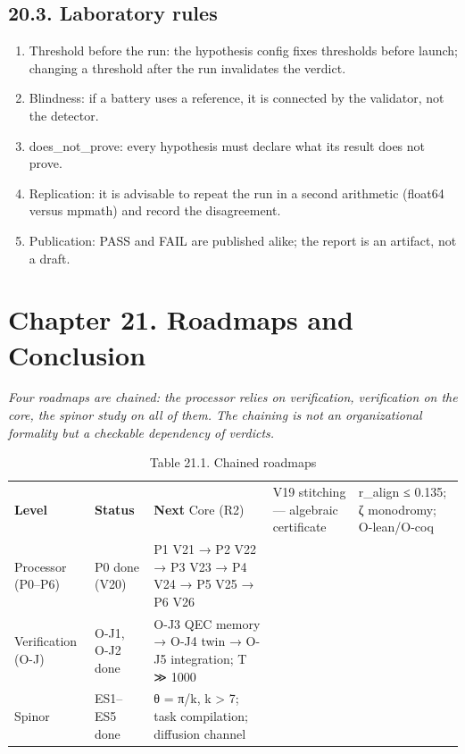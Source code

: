\documentclass[11pt,a4paper]{article}
\begin{document}
\subsection{20.3. Laboratory rules}

\begin{enumerate}
  \item Threshold before the run: the hypothesis config fixes thresholds before launch; changing a threshold after the run invalidates the verdict.
  \item Blindness: if a battery uses a reference, it is connected by the validator, not the detector.
  \item does\_not\_prove: every hypothesis must declare what its result does not prove.
  \item Replication: it is advisable to repeat the run in a second arithmetic (float64 versus mpmath) and record the disagreement.
  \item Publication: PASS and FAIL are published alike; the report is an artifact, not a draft.
\end{enumerate}

\section{Chapter 21. Roadmaps and Conclusion}

\noindent\textit{\color{copper}Four roadmaps are chained: the processor relies on verification, verification on the core, the spinor study on all of them. The chaining is not an organizational formality but a checkable dependency of verdicts.}

\begin{table}[htbp]\centering\small
\caption{Table 21.1. Chained roadmaps}
\begin{tabular}{p{} p{} p{}}
\toprule
\textbf{Level} & \textbf{Status} & \textbf{Next}
\midrule
Core (R2) & V19 stitching — algebraic certificate & r\_align ≤ 0.135; ζ monodromy; O-lean/O-coq \\
Processor (P0–P6) & P0 done (V20) & P1 V21 → P2 V22 → P3 V23 → P4 V24 → P5 V25 → P6 V26 \\
Verification (O-J) & O-J1, O-J2 done & O-J3 QEC memory → O-J4 twin → O-J5 integration; T ≫ 1000 \\
Spinor & ES1–ES5 done & θ = π/k, k > 7; task compilation; diffusion channel \\
\bottomrule
\end{tabular}
\end{table}
\end{document}
